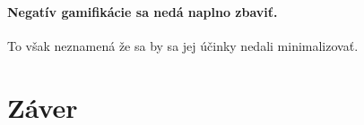 \documentclass[10pt,twoside,slovak,a4paper]{article}
\begin{document}
\paragraph{Negatív gamifikácie sa nedá naplno zbaviť.}
To však neznamená že sa by sa jej účinky nedali minimalizovať.


\section{Záver} \label{Zaver} %






\end{document}
